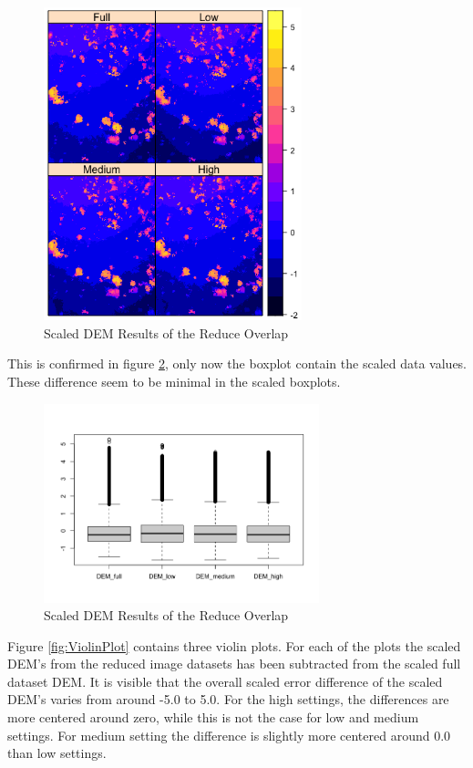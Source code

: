 \documentclass{isprs} %
\begin{document}
\begin{figure}[h]
    \centering
    \includegraphics[width=7.5cm]{DEM2x2_scaled.png}
    \caption{Scaled DEM Results of the Reduce Overlap}
    \label{fig:DemPlot_scaled}
\end{figure}

This is confirmed in figure \ref{fig:BoxPlot_scaled}, only now the boxplot contain the scaled data values.
These difference seem to be minimal in the scaled boxplots.

\begin{figure}[ht]
    \centering
    \includegraphics[width=8cm]{DemBoxPlot_Scaled.png}
    \caption{Scaled DEM Results of the Reduce Overlap}
    \label{fig:BoxPlot_scaled}
\end{figure}

Figure \ref{fig:ViolinPlot} contains three violin plots. For each of the plots the scaled DEM's from the reduced image datasets has been subtracted from the scaled full dataset DEM.
It is visible that the overall scaled error difference of the scaled DEM's varies from around -5.0 to 5.0.
For the high settings, the differences are more centered around zero, while this is not the case for low and medium settings.
For medium setting the difference is slightly more centered around 0.0 than low settings.
\end{document}
